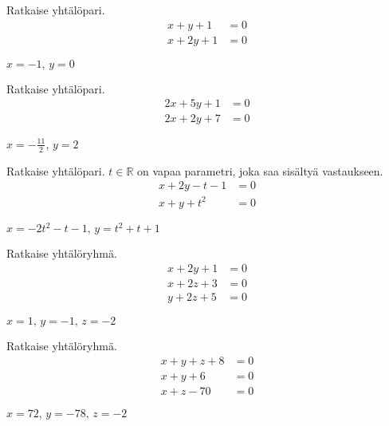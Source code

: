 \begin{tehtavasivu}

\begin{tehtava}
    Ratkaise yhtälöpari.
    \begin{align*}
        x+y+1 &= 0 \\
        x+2y+1 &=0
    \end{align*}
    \begin{vastaus}
        $x = -1, \, y = 0$
    \end{vastaus}
\end{tehtava}

\begin{tehtava}
    Ratkaise yhtälöpari.
    \begin{align*}
        2x+5y+1 &= 0 \\
        2x+2y+7 &=0
    \end{align*}
    \begin{vastaus}
        $x = -\frac{11}{2}, \, y = 2$
    \end{vastaus}
\end{tehtava}

\begin{tehtava}
    Ratkaise yhtälöpari. $t \in \mathbb{R}$ on vapaa parametri, joka saa sisältyä vastaukseen.
    \begin{align*}
        x+2y-t-1 &= 0 \\
        x+y+t^2 &=0
    \end{align*}
    \begin{vastaus}
        $x = -2t^2-t-1, \, y = t^2+t+1$
    \end{vastaus}
\end{tehtava}

\begin{tehtava}
    Ratkaise yhtälöryhmä.
    \begin{align*}
        x+2y+1 &= 0 \\
        x+2z+3 &=0 \\
        y+2z+5 &=0
    \end{align*}
    \begin{vastaus}
        $x = 1, \, y = -1, \, z = -2$
    \end{vastaus}
\end{tehtava}

\begin{tehtava}
    Ratkaise yhtälöryhmä.
    \begin{align*}
        x+y+z+8 &= 0 \\
        x+y+6 &=0 \\
        x+z-70 &=0
    \end{align*}
    \begin{vastaus}
        $x = 72, \, y = -78, \, z = -2$
    \end{vastaus}
\end{tehtava}


\end{tehtavasivu}
